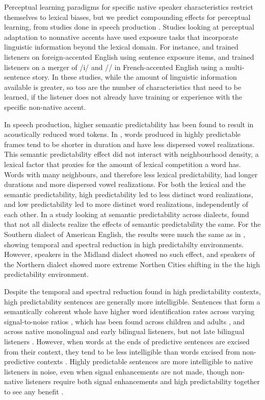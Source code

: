 Perceptual learning paradigms for specific native speaker characteristics restrict themselves to lexical biases, but we predict compounding effects for perceptual learning, from studies done in speech production \citep{Clopper2008, Scarborough2010}.  
Studies looking at perceptual adaptation to nonnative accents have used exposure tasks that incorporate linguistic information beyond the lexical domain.  
For instance, \citet{Clarke2004} and \citet{Bradlow2008} trained listeners on foreign-accented English using sentence exposure items, and \citet{Trude2013} trained listeners on a merger of /i/ and /\textsci/ in French-accented English using a multi-sentence story.
In these studies, while the amount of linguistic information available is greater, so too are the number of characteristics that need to be learned, if the listener does not already have training or experience with the specific non-native accent.

In speech production, higher semantic predictability has been found to result in acoustically reduced word tokens.  
In \citet{Scarborough2010}, words produced in highly predictable frames tend to be shorter in duration and have less dispersed vowel realizations.  
This semantic predictability effect did not interact with neighbourhood density, a lexical factor that proxies for the amount of lexical competition a word has.  
Words with many neighbours, and therefore less lexical predictability, had longer durations and more dispersed vowel realizations.  
For both the lexical and the semantic predictability, high predictability led to less distinct word realizations, and low predictability led to more distinct word realizations, independently of each other.
In a study looking at semantic predictability across dialects, \citet{Clopper2008} found that not all dialects realize the effects of semantic predictability the same.  
For the Southern dialect of American English, the results were much the same as in \citet{Scarborough2010}, showing temporal and spectral reduction in high predictabilty environments.  
However, speakers in the Midland dialect showed no such effect, and speakers of the Northern dialect showed more extreme Northen Cities shifting in the the high predictability environment.

Despite the temporal and spectral reduction found in high predictability contexts, high predictability sentences are generally more intelligible.
Sentences that form a semantically coherent whole have higher word identification rates across varying signal-to-noise ratios \citep{Kalikow1977}, which has been found across children and adults \citep{Fallon2002}, and across native monolingual and early bilingual listeners, but not late bilingual listeners \citep{Mayo1997}.
However, when words at the ends of predictive sentences are excised from their context, they tend to be less intelligible than words excised from non-predictive contexts \citep{Lieberman1963}.
Highly predictable sentences are more intelligible to native listeners in noise, even when signal enhancements are not made, though non-native listeners require both signal enhancements and high predictability together to see any benefit \cite{Bradlow2007}.

